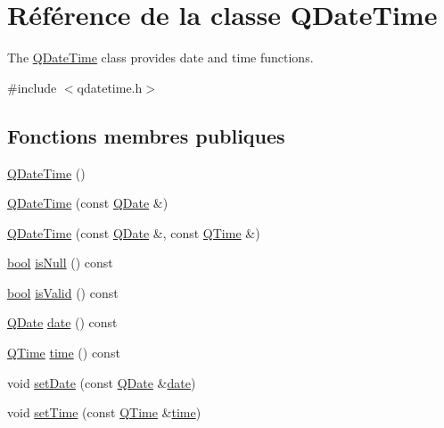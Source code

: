 \hypertarget{class_q_date_time}{}\section{Référence de la classe Q\+Date\+Time}
\label{class_q_date_time}


The \hyperlink{class_q_date_time}{Q\+Date\+Time} class provides date and time functions.  




{\ttfamily \#include $<$qdatetime.\+h$>$}

\subsection*{Fonctions membres publiques}
\begin{DoxyCompactItemize}
\item 
\hyperlink{class_q_date_time_a497eebb04afafe0ec04d02417b57aba8}{Q\+Date\+Time} ()
\item 
\hyperlink{class_q_date_time_a1da374c4242c84a1d228e572ab964dcf}{Q\+Date\+Time} (const \hyperlink{class_q_date}{Q\+Date} \&)
\item 
\hyperlink{class_q_date_time_ac4b95956f346d9213b43624ec93e5625}{Q\+Date\+Time} (const \hyperlink{class_q_date}{Q\+Date} \&, const \hyperlink{class_q_time}{Q\+Time} \&)
\item 
\hyperlink{qglobal_8h_a1062901a7428fdd9c7f180f5e01ea056}{bool} \hyperlink{class_q_date_time_aeeeba89806c4b15eb63154ca0d22568a}{is\+Null} () const 
\item 
\hyperlink{qglobal_8h_a1062901a7428fdd9c7f180f5e01ea056}{bool} \hyperlink{class_q_date_time_a6266594a48c25047f7829a83226db523}{is\+Valid} () const 
\item 
\hyperlink{class_q_date}{Q\+Date} \hyperlink{class_q_date_time_aca48c7a8c9cac0513d540c380c847d5f}{date} () const 
\item 
\hyperlink{class_q_time}{Q\+Time} \hyperlink{class_q_date_time_a282a144980f6543f9412ac7957b5ab9f}{time} () const 
\item 
void \hyperlink{class_q_date_time_aba938ae7007f881a6a641bbdb3ac634a}{set\+Date} (const \hyperlink{class_q_date}{Q\+Date} \&\hyperlink{class_q_date_time_aca48c7a8c9cac0513d540c380c847d5f}{date})
\item 
void \hyperlink{class_q_date_time_a6384cf8a49551d5e42786ab850894813}{set\+Time} (const \hyperlink{class_q_time}{Q\+Time} \&\hyperlink{class_q_date_time_a282a144980f6543f9412ac7957b5ab9f}{time})
\item 

\end{DoxyCompactItemize}
